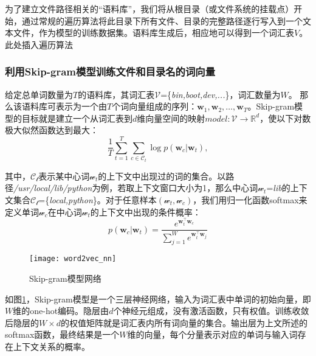 为了建立文件路径相关的“语料库”，我们将从根目录（或文件系统的挂载点）开始，通过常规的遍历算法将此目录下所有文件、目录的完整路径逐行写入到一个文本文件，作为模型的训练数据集。语料库生成后，相应地可以得到一个词汇表$V$。
{\color{red}此处插入遍历算法}

\subsubsection*{利用Skip-gram模型训练文件和目录名的词向量}
给定总单词数量为$T$的语料库，其词汇表$\mathcal{V}$=\{\textit{bin,boot,dev,...}\}，词汇数量为$W$。
那么该语料库可表示为一个由$T$个词向量组成的序列：$\mathbf{w}_1, \mathbf{w}_2, \dots, \mathbf{w}_T$。Skip-gram模型的目标就是建立一个从词汇表到$d$维向量空间的映射$model:\mathcal{V} \rightarrow \mathbb{R}^d$，使以下对数极大似然函数达到最大：
\begin{equation}
    \label{eq:origin_object}
    \frac{1}{T}\sum_{t=1}^T \sum_{c \in \mathcal{C}_t} \log p(\mathbf{w}_c | \mathbf{w}_t),
\end{equation}

其中，$\mathcal{C_t}$表示某中心词$\mathcal{w}_t$的上下文中出现过的词的集合。以路径\textit{/usr/local/lib/python}为例，若取上下文窗口大小为1，那么中心词$\mathcal{w}_t$=\textit{lib}的上下文集合$\mathcal{C_t}$=\{\textit{local,python}\}。对于任意样本$(\mathbf{\mathcal{w}}_t,\mathbf{\mathcal{w}}_c)$，我们用归一化函数softmax来定义单词$\mathcal{w}_c$在中心词$\mathbf{\mathcal{w}}_t$的上下文中出现的条件概率：
\begin{equation}
    \label{eq:softmax}
    p(\mathbf{w}_c | \mathbf{w}_t)=\frac{ e^{ \mathbf{w}_t^{\top} \mathbf{w}_c} }{ \sum_{j=1}^W e^{\mathbf{w}_t^{\top} \mathbf{w}_j}} 
\end{equation}

\begin{figure}[htp]
\centering
\texttt{[image: word2vec\_nn]}
\caption{Skip-gram模型网络}
\label{fig:word2vec_nn}
\end{figure}
如图\ref{fig:word2vec_nn}，Skip-gram模型是一个三层神经网络，输入为词汇表中单词的初始向量，即$W$维的one-hot编码。隐层由$d$个神经元组成，没有激活函数，只有权值。训练收敛后隐层的$W\times d$的权值矩阵就是词汇表内所有词向量的集合。输出层为上文所述的softmax函数，最终结果是一个$W$维的向量，每个分量表示对应的单词与输入词存在上下文关系的概率。

